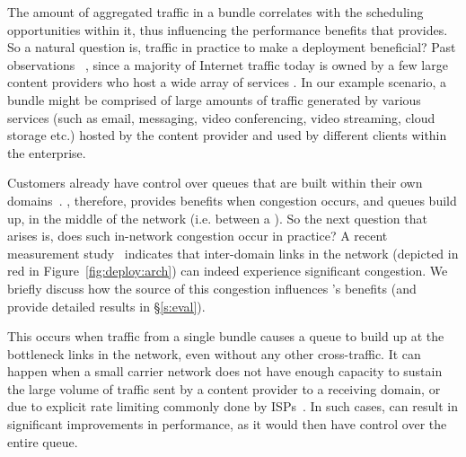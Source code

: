  The amount of aggregated traffic in a bundle correlates with the scheduling opportunities within it, thus influencing the performance benefits that \name provides. So a natural question is,  traffic in practice to make a \name deployment beneficial? Past observations~\cite{fivecomps, labovitz} , since a majority of Internet traffic today is owned by a few large content providers who host a wide array of services . In our example scenario, a bundle might be comprised of large amounts of traffic generated by various services (such as email, messaging, video conferencing, video streaming, cloud storage etc.) hosted by the content provider and used by different clients within the enterprise.




Customers already have control over queues that are built within their own domains~\cite{swan, b4, bwe}. \name, therefore, provides benefits when congestion occurs, and queues build up, in the middle of the network (i.e. between a \pair).  
So the next question that arises is, does such in-network congestion occur in practice? A recent measurement study~\cite{inferring-interdomain-congestion} indicates that inter-domain links in the network (depicted in red in Figure~\ref{fig:deploy:arch}) can indeed experience significant congestion. We briefly discuss how the source of this congestion influences \name's benefits (and provide detailed results in \S\ref{s:eval}).

 This occurs when traffic from a single bundle causes a queue to build up at the bottleneck links in the network, even without any other cross-traffic. It can happen when a small carrier network does not have enough capacity to sustain the large volume of traffic sent by a content provider to a receiving domain, or due to explicit rate limiting commonly done by ISPs~\cite{isp-throttle-1, isp-throttle-2, isp-throttle-3}.  In such cases, \name can result in significant improvements in performance, as it would then have control over the entire queue. 

